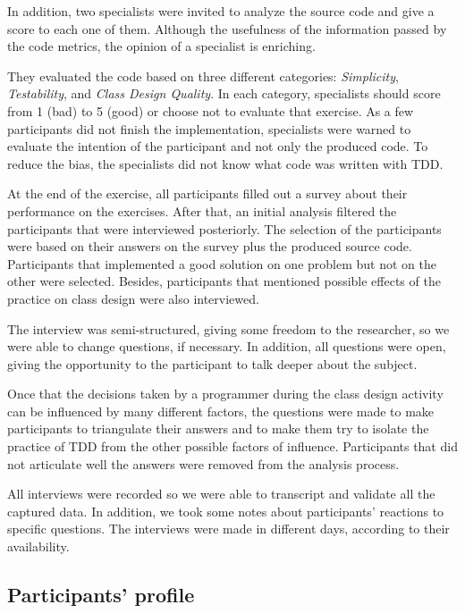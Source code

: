 \documentclass[conference]{IEEEtran}
\begin{document}
In addition, two specialists were invited to analyze the source code and give a score
to each one of them. Although the usefulness of the information passed by the code metrics,
the opinion of a specialist is enriching.

They evaluated the code based on three different categories: \textit{Simplicity}, \textit{Testability},
and \textit{Class Design Quality}. In each category, specialists should score from 1 (bad) to
5 (good) or choose not to evaluate that exercise. As a few participants did not finish the
implementation, specialists were warned to evaluate the intention of the participant and not
only the produced code.
To reduce the bias, the specialists did not know what code was written with TDD.

At the end of the exercise, all participants filled out a survey about their performance
on the exercises. After that, an initial analysis filtered the participants that
were interviewed posteriorly. The selection of the participants were based on
their answers on the survey plus the produced source code. Participants that implemented
a good solution on one problem but not on the other were selected. Besides, participants
that mentioned possible effects of the practice on class design were also interviewed.

The interview was semi-structured, giving some freedom to the researcher, so we were
able to change questions, if necessary. In addition, all questions were open, giving the
opportunity to the participant to talk deeper about the subject.

Once that the decisions taken by a programmer during the class design activity can be
influenced by many different factors, the questions were made to make participants
to triangulate their answers and to make them try to isolate the practice of TDD from
the other possible factors of influence. Participants that did not articulate well
the answers were removed from the analysis process.

All interviews were recorded so we were able to transcript and validate all
the captured data. In addition, we took some notes about participants' reactions
to specific questions. The interviews were made in different days,
according to their availability.

\subsection{Participants' profile}
\label{sec:planejamento-participantes}
\end{document}
